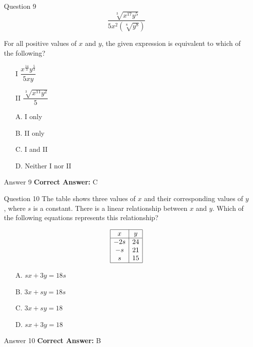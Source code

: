 \documentclass{beamer}
\begin{document}
\begin{frame}{Question 9}
\small
\[
\frac{\sqrt[3]{x^{17}y^5}}{5x^2\left(\sqrt[8]{y^8}\right)}
\]

For all positive values of \(x\) and \(y\), the given expression is equivalent to which of the following?

\begin{itemize}
\item[I] \(\dfrac{x^{\frac{14}{3}}y^{\frac{5}{3}}}{5xy}\)
\item[II] \(\dfrac{\sqrt[3]{x^{11}y^2}}{5}\)
\end{itemize}
\vspace{0.35cm}
\begin{enumerate}
    \item[A.] I only
    \item[B.] II only
    \item[C.] I and II
    \item[D.] Neither I nor II
\end{enumerate}
\end{frame}
\begin{frame}{Answer 9}
\small
\textbf{Correct Answer:} C
\end{frame}

\begin{frame}{Question 10}
\small
The table shows three values of \(x\) and their corresponding values of \(y\), where \(s\) is a constant.
There is a linear relationship between \(x\) and \(y\).
Which of the following equations represents this relationship?

\[
\begin{array}{|c|c|}
\hline
x & y \\
\hline
-2s & 24 \\
-s & 21 \\
s & 15 \\
\hline
\end{array}
\]
\vspace{0.35cm}
\begin{enumerate}
    \item[A.] \(sx + 3y = 18s\)
    \item[B.] \(3x + sy = 18s\)
    \item[C.] \(3x + sy = 18\)
    \item[D.] \(sx + 3y = 18\)
\end{enumerate}
\end{frame}
\begin{frame}{Answer 10}
\small
\textbf{Correct Answer:} B
\end{frame}
\end{document}
